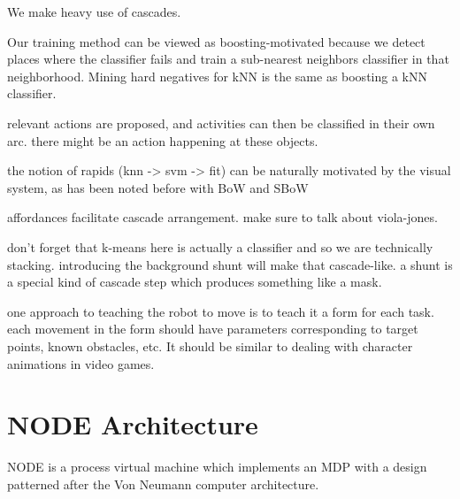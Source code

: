 \documentclass[conference]{IEEEtran}
\begin{document}
We make heavy use of cascades.

Our training method can be viewed as boosting-motivated because we detect places where
the classifier fails and train a sub-nearest neighbors classifier in that neighborhood.
Mining hard negatives for kNN is the same as boosting a kNN classifier.

relevant actions are proposed, and activities can then be classified in their 
own arc. there might be an action happening at these objects.

the notion of rapids (knn -> svm -> fit) can be naturally motivated by the 
visual system, as has been noted before with BoW and SBoW 

affordances facilitate cascade arrangement. make sure to talk about viola-jones.



don’t forget that k-means here is actually a classifier and so we are technically stacking. 
introducing the background shunt will make that cascade-like. a shunt is a special kind of 
cascade step which produces something like a mask.

one approach to teaching the robot to move is to teach it a form for each task. 
each movement in the form should have parameters corresponding to target points, 
known obstacles, etc.  It should be similar to dealing with character animations in video games. 


\section{NODE Architecture}

NODE is a process virtual machine which implements an MDP with a design patterned
after the Von Neumann computer architecture. 
\end{document}
